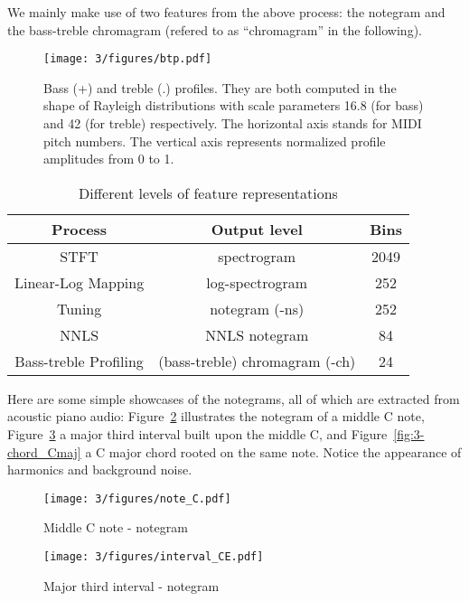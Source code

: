 We mainly make use of two features from the above process: the notegram and the bass-treble chromagram (refered to as ``chromagram'' in the following).

\begin{figure}[htb]
\centering
\texttt{[image: 3/figures/btp.pdf]}
\caption{Bass (+) and treble (.) profiles. They are both computed in the shape of Rayleigh distributions with scale parameters 16.8 (for bass) and 42 (for treble) respectively. The horizontal axis stands for MIDI pitch numbers. The vertical axis represents normalized profile amplitudes from 0 to 1.}
\label{fig:3-btprofile}
\end{figure}

\begin{table}[htb]
\centering
\footnotesize
\begin{tabular}{|c|c|c|} \hline
 Process & Output level & Bins \\ \hline
 STFT & spectrogram & 2049 \\ \hline
 Linear-Log Mapping & log-spectrogram & 252  \\ \hline
 Tuning & notegram (-ns) & 252 \\ \hline
 NNLS & NNLS notegram & 84  \\ \hline
 Bass-treble Profiling & (bass-treble) chromagram (-ch) & 24 \\ \hline
\end{tabular}
\caption{Different levels of feature representations}
\label{tab:3-felevels}
\end{table}

Here are some simple showcases of the notegrams, all of which are extracted from acoustic piano audio: Figure~\ref{fig:3-note_C} illustrates the notegram of a middle C note, Figure~\ref{fig:3-interval_CE} a major third interval built upon the middle C, and Figure~\ref{fig:3-chord_Cmaj} a C major chord rooted on the same note. Notice the appearance of harmonics and background noise.

\begin{figure}
\centering
\texttt{[image: 3/figures/note\_C.pdf]}
\caption{Middle C note - notegram}
\label{fig:3-note_C}
\end{figure}

\begin{figure}
\centering
\texttt{[image: 3/figures/interval\_CE.pdf]}
\caption{Major third interval - notegram}
\label{fig:3-interval_CE}
\end{figure}

